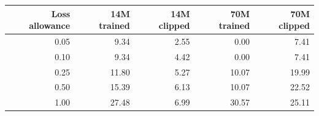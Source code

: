 \begin{tabular}{rrrrr}
\toprule
Loss allowance & 14M trained & 14M clipped & 70M trained & 70M clipped \\
\midrule
0.05 & 9.34 & 2.55 & 0.00 & 7.41 \\
0.10 & 9.34 & 4.42 & 0.00 & 7.41 \\
0.25 & 11.80 & 5.27 & 10.07 & 19.99 \\
0.50 & 15.39 & 6.13 & 10.07 & 22.52 \\
1.00 & 27.48 & 6.99 & 30.57 & 25.11 \\
\bottomrule
\end{tabular}
